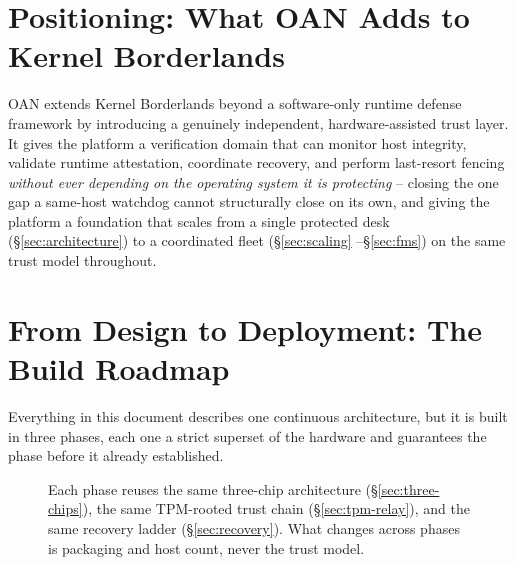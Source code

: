 \documentclass[11pt,a4paper]{article}
\newcommand{\figcap}[1]{\caption{#1}}
\begin{document}
\section{Positioning: What OAN Adds to Kernel Borderlands}

OAN extends Kernel Borderlands beyond a software-only runtime defense
framework by introducing a genuinely independent, hardware-assisted
trust layer. It gives the platform a verification domain that can
monitor host integrity, validate runtime attestation, coordinate
recovery, and perform last-resort fencing \emph{without ever depending
on the operating system it is protecting} -- closing the one gap a
same-host watchdog cannot structurally close on its own, and giving the
platform a foundation that scales from a single protected desk
(\S\ref{sec:architecture}) to a coordinated fleet (\S\ref{sec:scaling}
--\S\ref{sec:fms}) on the same trust model throughout.

\section{From Design to Deployment: The Build Roadmap}
\label{sec:roadmap}

Everything in this document describes one continuous architecture, but
it is built in three phases, each one a strict superset of the
hardware and guarantees the phase before it already established.

\begin{figure}[h!]
\centering
{}
\figcap{Each phase reuses the same three-chip architecture (\S\ref{sec:three-chips}), the same TPM-rooted trust chain (\S\ref{sec:tpm-relay}), and the same recovery ladder (\S\ref{sec:recovery}). What changes across phases is packaging and host count, never the trust model.}
\label{fig:roadmap}
\end{figure}
\end{document}
